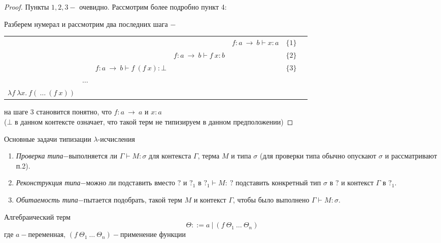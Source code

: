 	\begin{proof}
		Пункты $1, 2, 3-$ очевидно. Рассмотрим более подробно пункт 4:
		\par Разберем нумерал и рассмотрим два последних шага $-$


	\begin{table}[H]
			\begin{tabular}{ccccccc}
				&&&&\multicolumn{1}{c}{$f:a\:\rightarrow\:b  \vdash  x:a$}& $\{1\}$\\
				\cline{4-5}
				&&&\multicolumn{1}{c}{$f:a\:\rightarrow\:b  \vdash f\:x:b$}&&$\{2\}$\\
				\cline{3-4}
				&&\multicolumn{1}{c}{$f:a\:\rightarrow\:b  \vdash f\:(f\:x):\bot$}&&&$\{3\}$\\
				\cline{2-3}
				&\multicolumn{1}{c}{$\hdots$}\\
				\cline{1-2}
				\multicolumn{1}{c}{$\lambda f\:\lambda x. \:f(\:\hdots\:(f\:x))$}&&&&&&\\
			\end{tabular}
		\end{table}
		на шаге 3 становится понятно, что $f:a\:\rightarrow\:a$ и $x:a$
		\\($\bot$ в данном контексте означает, что такой терм не типизируем в данном предположении)
		\end{proof}

	\begin{statement}Основные задачи типизации $\lambda$-исчисления\end{statement}
		\begin{enumerate}
			\item \emph{Проверка типа$-$}выполняется ли $\Gamma\vdash M:\sigma$ для контекста $\Gamma\text{, терма }M\text{ и типа }\sigma$ (для проверки типа обычно опускают $\sigma$ и рассматривают п.2).
			\item \emph{Реконструкция типа$-$}можно ли подставить вместо $?$ и $?_1$ в $?_1\vdash M:\:?$ подставить конкретный тип $\sigma$ в $?$ и контекст $\Gamma$ в $?_1$.
			\item \emph{Обитаемость типа$-$}пытается подобрать, такой терм $M$ и контекст $\Gamma$, чтобы было выполнено $\Gamma\vdash M:\sigma$.
		\end{enumerate}			
	\begin{definition}Алгебраический терм $$\Theta::=a\:|\:(f\:\Theta_1\:\ldots\:\Theta_n)$$ где $a-$переменная, $(f\:\Theta_1\:\ldots\:\Theta_n)-$применение функции \end{definition}
